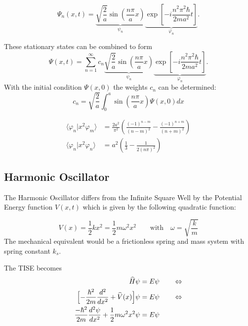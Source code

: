 \begin{equation*}
    \Psi_n(x,t)=\underbrace{\sqrt{\frac{2}{a}}\sin\left(\frac{n\pi}{a}x\right)}_{\psi_n} \underbrace{\exp\left[-i\frac{n^{2}\pi^{2}\hbar}{2ma^{2}}t\right]}_{\varphi_n}.
\end{equation*}


These stationary states can be combined to form
\noindent\begin{equation*}
    \Psi(x,t)=\sum_{n=1}^{\infty}c_{n} \underbrace{\sqrt{\frac{2}{a}}\sin\left(\frac{n\pi}{a}x\right)}_{\psi_n} \underbrace{\exp\left[-i\frac{n^{2}\pi^{2}\hbar}{2ma^{2}}t\right]}_{\varphi_n}.
\end{equation*}
With the initial condition $\Psi(x,0)$ the weights $c_n$ can be determined:
\noindent\begin{equation*}
    c_n=\sqrt{\frac{2}{a}}\int_0^a\sin\left(\frac{n\pi}{a}x\right)\Psi(x,0)dx
\end{equation*}

\noindent\begin{align*}
    \langle \varphi_n|x^2\varphi_m\rangle & = \frac{2a^2}{\pi^2}\left(\frac{{(-1)}^{n-m}}{{(n-m)}^2}-\frac{{(-1)}^{n+m}}{{(n+m)}^2}\right) \\
    \langle \varphi_n|x^2\varphi_n\rangle & = a^2\left(\frac{1}{3} -\frac{1}{2{(n\pi)}^2}\right)
\end{align*}


\subsection{Harmonic Oscillator}

The Harmonic Oscillator differs from the Infinite Square Well by the Potential Energy function $V(x,t)$ which is given by the following quadratic function:

\begin{equation*}
    V(x) = \frac{1}{2}k x^2 = \frac{1}{2}m \omega^2 x^2 \qquad \text{with} \quad \omega = \sqrt{\frac{k}{m}}
\end{equation*}
The mechanical equivalent would be a frictionless spring and mass system with spring constant $k_s$.

\newpar{}

The TISE becomes
\noindent\begin{align*}
    \widehat{H}\psi                                                          & = E\psi \qquad \Leftrightarrow \\
    \Bigl[-\frac{\hbar^2}{2m}\frac{d^2}{dx^2}+\widehat{V}(x)\Bigr]\psi       & = E\psi \qquad \Leftrightarrow \\
    \frac{-\hbar^2}{2m}\frac{d^2\psi}{dx^2} + \frac{1}{2}m \omega^2 x^2 \psi & = E\psi
\end{align*}

